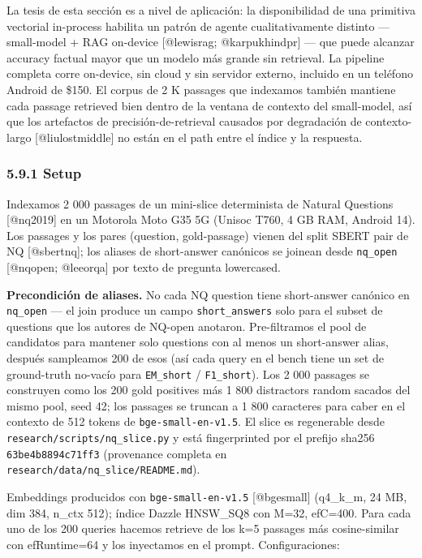 La tesis de esta sección es a nivel de aplicación: la disponibilidad de una
primitiva vectorial in-process habilita un patrón de agente cualitativamente
distinto --- small-model + RAG on-device {[}@lewisrag; @karpukhindpr{]} --- que
puede alcanzar accuracy factual mayor que un modelo más grande sin retrieval. La
pipeline completa corre on-device, sin cloud y sin servidor externo, incluido en
un teléfono Android de \$150. El corpus de 2 K passages que indexamos también
mantiene cada passage retrieved bien dentro de la ventana de contexto del
small-model, así que los artefactos de precisión-de-retrieval causados por
degradación de contexto-largo {[}@liulostmiddle{]} no están en el path entre el
índice y la respuesta.

\subsubsection{5.9.1 Setup}\label{setup}

Indexamos 2 000 passages de un mini-slice determinista de Natural Questions
{[}@nq2019{]} en un Motorola Moto G35 5G (Unisoc T760, 4 GB RAM, Android 14).
Los passages y los pares (question, gold-passage) vienen del split SBERT pair de
NQ {[}@sbertnq{]}; los aliases de short-answer canónicos se joinean desde
\texttt{nq\_open} {[}@nqopen; @leeorqa{]} por texto de pregunta lowercased.

\textbf{Precondición de aliases.} No cada NQ question tiene short-answer
canónico en \texttt{nq\_open} --- el join produce un campo
\texttt{short\_answers} solo para el subset de questions que los autores de
NQ-open anotaron. Pre-filtramos el pool de candidatos para mantener solo
questions con al menos un short-answer alias, después sampleamos 200 de esos
(así cada query en el bench tiene un set de ground-truth no-vacío para
\texttt{EM\_short} / \texttt{F1\_short}). Los 2 000 passages se construyen como
los 200 gold positives más 1 800 distractors random sacados del mismo pool, seed
42; los passages se truncan a 1 800 caracteres para caber en el contexto de 512
tokens de \texttt{bge-small-en-v1.5}. El slice es regenerable desde
\texttt{research/scripts/nq\_slice.py} y está fingerprinted por el prefijo
sha256 \texttt{63be4b8894c71ff3} (provenance completa en
\texttt{research/data/nq\_slice/README.md}).

Embeddings producidos con \texttt{bge-small-en-v1.5} {[}@bgesmall{]} (q4\_k\_m,
24 MB, dim 384, n\_ctx 512); índice Dazzle HNSW\_SQ8 con M=32, efC=400. Para
cada uno de los 200 queries hacemos retrieve de los k=5 passages más
cosine-similar con efRuntime=64 y los inyectamos en el prompt. Configuraciones:

